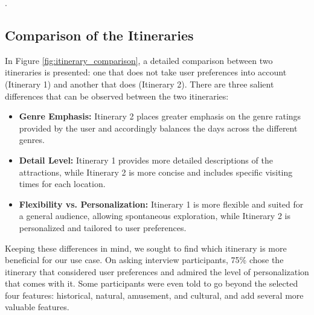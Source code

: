 \documentclass[sigconf,authordraft]{acmart}
\begin{document}
\newpage
.
\newpage

\subsection{Comparison of the Itineraries}

In Figure \ref{fig:itinerary_comparison}, a detailed comparison between two itineraries is presented: one that does not take user preferences into account (Itinerary 1) and another that does (Itinerary 2). There are three salient differences that can be observed between the two itineraries:

\begin{itemize}
\item \textbf{Genre Emphasis:} Itinerary 2 places greater emphasis on the genre ratings provided by the user and accordingly balances the days across the different genres.

\item \textbf{Detail Level:} Itinerary 1 provides more detailed descriptions of the attractions, while Itinerary 2 is more concise and includes specific visiting times for each location.

\item \textbf{Flexibility vs. Personalization:} Itinerary 1 is more flexible and suited for a general audience, allowing spontaneous exploration, while Itinerary 2 is personalized and tailored to user preferences.
\end{itemize}

Keeping these differences in mind, we sought to find which itinerary is more beneficial for our use case. On asking interview participants, 75\% chose the itinerary that considered user preferences and admired the level of personalization that comes with it. Some participants were even told to go beyond the selected four features: historical, natural, amusement, and cultural, and add several more valuable features.
\newpage

% 
% 



\end{document}
